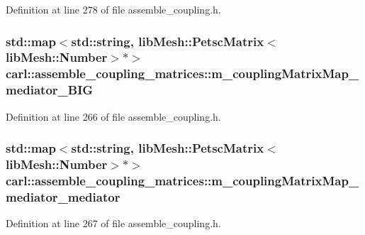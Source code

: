 Definition at line 278 of file assemble\+\_\+coupling.\+h.

\hypertarget{classcarl_1_1assemble__coupling__matrices_af8127910d360a01b1b9c9878f03282f4}{}
\subsubsection[{m\+\_\+coupling\+Matrix\+Map\+\_\+mediator\+\_\+\+B\+I\+G}]{\setlength{\rightskip}{0pt plus 5cm}std\+::map$<$std\+::string, lib\+Mesh\+::\+Petsc\+Matrix$<$lib\+Mesh\+::\+Number$>$$\ast$$>$ carl\+::assemble\+\_\+coupling\+\_\+matrices\+::m\+\_\+coupling\+Matrix\+Map\+\_\+mediator\+\_\+\+B\+I\+G\hspace{0.3cm}{\ttfamily [protected]}}\label{classcarl_1_1assemble__coupling__matrices_af8127910d360a01b1b9c9878f03282f4}


Definition at line 266 of file assemble\+\_\+coupling.\+h.

\hypertarget{classcarl_1_1assemble__coupling__matrices_a1a838735ff335cdf1d24403ceab3b896}{}
\subsubsection[{m\+\_\+coupling\+Matrix\+Map\+\_\+mediator\+\_\+mediator}]{\setlength{\rightskip}{0pt plus 5cm}std\+::map$<$std\+::string, lib\+Mesh\+::\+Petsc\+Matrix$<$lib\+Mesh\+::\+Number$>$$\ast$$>$ carl\+::assemble\+\_\+coupling\+\_\+matrices\+::m\+\_\+coupling\+Matrix\+Map\+\_\+mediator\+\_\+mediator\hspace{0.3cm}{\ttfamily [protected]}}\label{classcarl_1_1assemble__coupling__matrices_a1a838735ff335cdf1d24403ceab3b896}


Definition at line 267 of file assemble\+\_\+coupling.\+h.

